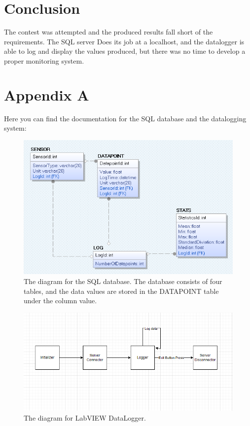 \documentclass[11pt, A4paper, english]{article}
\begin{document}
{	\section{Conclusion}
The contest was attempted and the produced results fall short of the requirements. The SQL server Does its job at a localhost, and the datalogger is able to log and display the values produced, but there was no time to develop a proper monitoring system.

\printbibliography
	
	\section{Appendix A}
Here you can find the documentation for the SQL database and the datalogging system:
		\begin{figure}[H]
\includegraphics[width=0.9\linewidth]{Diagrams/SQLDiagram.png}
\caption{The diagram for the SQL database. The database consists of four tables, and the data values are stored in the DATAPOINT table under the column value.}
		\end{figure}
		
		\begin{figure}[H]
\includegraphics[width=0.9\linewidth]{Diagrams/Logger.png}
\caption{The diagram for LabVIEW DataLogger.}
		\end{figure}

}
\end{document}
